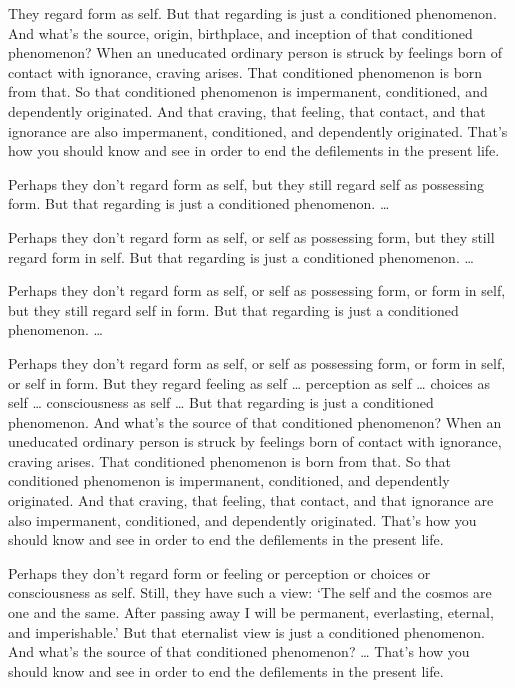 \documentclass[12pt,openany]{book}%
\begin{document}
They regard form as self. But that regarding is just a conditioned phenomenon. And what’s the source, origin, birthplace, and inception of that conditioned phenomenon? When an uneducated ordinary person is struck by feelings born of contact with ignorance, craving arises. That conditioned phenomenon is born from that. So that conditioned phenomenon is impermanent, conditioned, and dependently originated. And that craving, that feeling, that contact, and that ignorance are also impermanent, conditioned, and dependently originated. That’s how you should know and see in order to end the defilements in the present life. 

Perhaps they don’t regard form as self, but they still regard self as possessing form. But that regarding is just a conditioned phenomenon. … 

Perhaps they don’t regard form as self, or self as possessing form, but they still regard form in self. But that regarding is just a conditioned phenomenon. … 

Perhaps they don’t regard form as self, or self as possessing form, or form in self, but they still regard self in form. But that regarding is just a conditioned phenomenon. … 

Perhaps they don’t regard form as self, or self as possessing form, or form in self, or self in form. But they regard feeling as self … perception as self … choices as self … consciousness as self … But that regarding is just a conditioned phenomenon. And what’s the source of that conditioned phenomenon? When an uneducated ordinary person is struck by feelings born of contact with ignorance, craving arises. That conditioned phenomenon is born from that. So that conditioned phenomenon is impermanent, conditioned, and dependently originated. And that craving, that feeling, that contact, and that ignorance are also impermanent, conditioned, and dependently originated. That’s how you should know and see in order to end the defilements in the present life. 

Perhaps they don’t regard form or feeling or perception or choices or consciousness as self. Still, they have such a view: ‘The self and the cosmos are one and the same. After passing away I will be permanent, everlasting, eternal, and imperishable.’ But that eternalist view is just a conditioned phenomenon. And what’s the source of that conditioned phenomenon? … That’s how you should know and see in order to end the defilements in the present life. 
\end{document}
